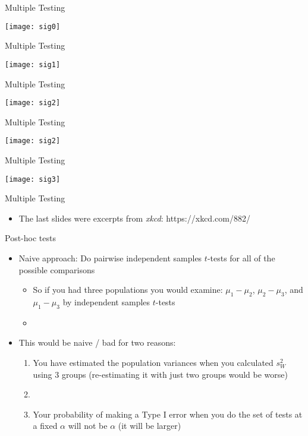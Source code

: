 \documentclass[xcolor=dvipsnames]{beamer}
\begin{document}
\begin{frame}{Multiple Testing}
\begin{center}
	\texttt{[image: sig0]}
\end{center}
\end{frame}

\begin{frame}{Multiple Testing}
	\begin{center}
		\texttt{[image: sig1]}
	\end{center}
\end{frame}

\begin{frame}{Multiple Testing}
\begin{center}
	\texttt{[image: sig2]}
\end{center}
\end{frame}

\begin{frame}{Multiple Testing}
\begin{center}
	\texttt{[image: sig2]}
\end{center}
\end{frame}

\begin{frame}{Multiple Testing}
\begin{center}
	\texttt{[image: sig3]}
\end{center}
\end{frame}

\begin{frame}{Multiple Testing}
\begin{itemize}
	\item The last slides were excerpts from \emph{xkcd}: https://xkcd.com/882/
\end{itemize}
\end{frame}

\begin{frame}{Post-hoc tests}
\begin{itemize}
	\item Naive approach: Do pairwise independent samples $t$-tests for all of the possible comparisons
	\begin{itemize}
		\item So if you had three populations you would examine: $\mu_1-\mu_2$, $\mu_2-\mu_3$, and $\mu_1-\mu_3$ by independent samples $t$-tests
		\item[]
	\end{itemize}
	\item This would be naive / bad for two reasons:
	\begin{enumerate}
		\item You have estimated the population variances when you calculated $s^2_W$ using 3 groups (re-estimating it with just two groups would be worse)
		\item[]
		\item Your probability of making a Type I error when you do the set of tests at a fixed $\alpha$ will not be $\alpha$ (it will be larger)
	\end{enumerate}
\end{itemize}
\end{frame}
\end{document}
